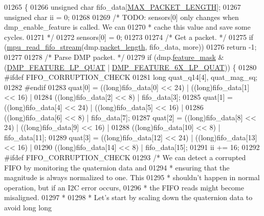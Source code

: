 \begin{DoxyCode}
01265 \{
01266     \textcolor{keywordtype}{unsigned} \textcolor{keywordtype}{char} fifo\_data[\hyperlink{group___d_r_i_v_e_r_s_ga973c680573b37fc359fc68d0707da355}{MAX\_PACKET\_LENGTH}];
01267     \textcolor{keywordtype}{unsigned} \textcolor{keywordtype}{char} ii = 0;
01268 
01269     \textcolor{comment}{/* TODO: sensors[0] only changes when dmp\_enable\_feature is called. We can}
01270 \textcolor{comment}{     * cache this value and save some cycles.}
01271 \textcolor{comment}{     */}
01272     sensors[0] = 0;
01273 
01274     \textcolor{comment}{/* Get a packet. */}
01275     \textcolor{keywordflow}{if} (\hyperlink{group___d_r_i_v_e_r_s_ga13593044949b460e9f571eb57e9a0788}{mpu\_read\_fifo\_stream}(dmp.\hyperlink{structdmp__s_a6423143ff761c75d97f34c8465393ea0}{packet\_length}, fifo\_data, more))
01276         \textcolor{keywordflow}{return} -1;
01277 
01278     \textcolor{comment}{/* Parse DMP packet. */}
01279     \textcolor{keywordflow}{if} (dmp.\hyperlink{structdmp__s_ac1c048fa56b613b3223d2e66ac2c050f}{feature\_mask} & (\hyperlink{group___d_r_i_v_e_r_s_gabf442c0477f8f7704a8094519ddfe38e}{DMP\_FEATURE\_LP\_QUAT} | 
      \hyperlink{group___d_r_i_v_e_r_s_gae879a3c9729f9e1be5e6d7c9211c69c0}{DMP\_FEATURE\_6X\_LP\_QUAT})) \{
01280 \textcolor{preprocessor}{#ifdef FIFO\_CORRUPTION\_CHECK}
01281         \textcolor{keywordtype}{long} quat\_q14[4], quat\_mag\_sq;
01282 \textcolor{preprocessor}{#endif}
01283         quat[0] = ((long)fifo\_data[0] << 24) | ((long)fifo\_data[1] << 16) |
01284             ((long)fifo\_data[2] << 8) | fifo\_data[3];
01285         quat[1] = ((long)fifo\_data[4] << 24) | ((long)fifo\_data[5] << 16) |
01286             ((long)fifo\_data[6] << 8) | fifo\_data[7];
01287         quat[2] = ((long)fifo\_data[8] << 24) | ((long)fifo\_data[9] << 16) |
01288             ((long)fifo\_data[10] << 8) | fifo\_data[11];
01289         quat[3] = ((long)fifo\_data[12] << 24) | ((long)fifo\_data[13] << 16) |
01290             ((long)fifo\_data[14] << 8) | fifo\_data[15];
01291         ii += 16;
01292 \textcolor{preprocessor}{#ifdef FIFO\_CORRUPTION\_CHECK}
01293         \textcolor{comment}{/* We can detect a corrupted FIFO by monitoring the quaternion data and}
01294 \textcolor{comment}{         * ensuring that the magnitude is always normalized to one. This}
01295 \textcolor{comment}{         * shouldn't happen in normal operation, but if an I2C error occurs,}
01296 \textcolor{comment}{         * the FIFO reads might become misaligned.}
01297 \textcolor{comment}{         *}
01298 \textcolor{comment}{         * Let's start by scaling down the quaternion data to avoid long long}

\end{DoxyCode}
